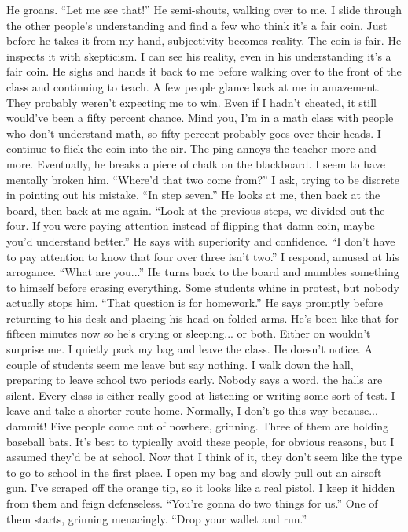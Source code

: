 \documentclass[a4paper, 12pt]{book}
\begin{document}
\newline
\tab
He groans. ``Let me see that!'' He semi-shouts, walking over to me. I slide through the other people’s understanding and find a few who think it’s a fair coin. Just before he takes it from my hand, subjectivity becomes reality. The coin is fair. He inspects it with skepticism. I can see his reality, even in his understanding it’s a fair coin. He sighs and hands it back to me before walking over to the front of the class and continuing to teach.
\newline
\tab
A few people glance back at me in amazement. They probably weren’t expecting me to win. Even if I hadn’t cheated, it still would’ve been a fifty percent chance. Mind you, I’m in a math class with people who don’t understand math, so fifty percent probably goes over their heads. I continue to flick the coin into the air. The ping annoys the teacher more and more. Eventually, he breaks a piece of chalk on the blackboard. I seem to have mentally broken him. ``Where’d that two come from?'' I ask, trying to be discrete in pointing out his mistake, ``In step seven.''
\newline
\tab
He looks at me, then back at the board, then back at me again. ``Look at the previous steps, we divided out the four. If you were paying attention instead of flipping that damn coin, maybe you’d understand better.'' He says with superiority and confidence.
\newline
\tab
``I don’t have to pay attention to know that four over three isn’t two.'' I respond, amused at his arrogance.
\newline
\tab
``What are you...'' He turns back to the board and mumbles something to himself before erasing everything. Some students whine in protest, but nobody actually stops him. ``That question is for homework.'' He says promptly before returning to his desk and placing his head on folded arms.
\newline
\tab
He’s been like that for fifteen minutes now so he’s crying or sleeping... or both. Either on wouldn’t surprise me. I quietly pack my bag and leave the class. He doesn’t notice. A couple of students seem me leave but say nothing. I walk down the hall, preparing to leave school two periods early. Nobody says a word, the halls are silent. Every class is either really good at listening or writing some sort of test.
\newline
\tab
I leave and take a shorter route home. Normally, I don’t go this way because... dammit! Five people come out of nowhere, grinning. Three of them are holding baseball bats. It’s best to typically avoid these people, for obvious reasons, but I assumed they’d be at school. Now that I think of it, they don’t seem like the type to go to school in the first place. I open my bag and slowly pull out an airsoft gun. I’ve scraped off the orange tip, so it looks like a real pistol. I keep it hidden from them and feign defenseless. ``You’re gonna do two things for us.'' One of them starts, grinning menacingly. ``Drop your wallet and run.''
\end{document}
